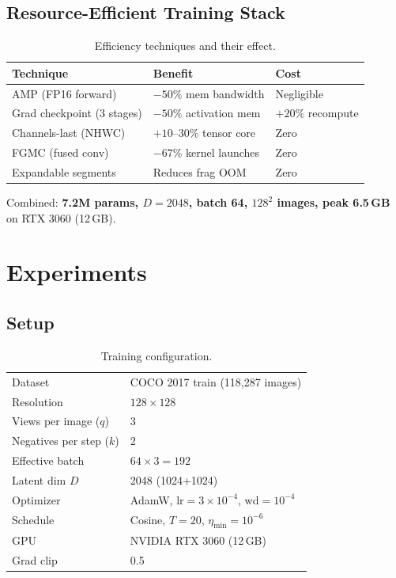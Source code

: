 \documentclass[10pt,twocolumn]{article}
\begin{document}
\subsection{Resource-Efficient Training Stack}

\begin{table}[h]
\centering\small
\caption{Efficiency techniques and their effect.}
\label{tab:efficiency}
\begin{tabular}{lll}
\toprule
Technique & Benefit & Cost \\
\midrule
AMP (FP16 forward) & $-50\%$ mem bandwidth & Negligible \\
Grad checkpoint (3 stages) & $-50\%$ activation mem & $+20\%$ recompute \\
Channels-last (NHWC) & $+10$--$30\%$ tensor core & Zero \\
FGMC (fused conv) & $-67\%$ kernel launches & Zero \\
Expandable segments & Reduces frag OOM & Zero \\
\bottomrule
\end{tabular}
\end{table}

Combined: \textbf{7.2M params, $D{=}2048$, batch 64, $128^2$ images,
peak 6.5\,GB} on RTX 3060 (12\,GB).

\section{Experiments}
\label{sec:exp}

\subsection{Setup}

\begin{table}[h]
\centering\small
\caption{Training configuration.}
\label{tab:setup}
\begin{tabular}{ll}
\toprule
Dataset & COCO 2017 train (118,287 images) \\
Resolution & $128\times128$ \\
Views per image ($q$) & 3 \\
Negatives per step ($k$) & 2 \\
Effective batch & $64\times3 = 192$ \\
Latent dim $D$ & 2048 (1024+1024) \\
Optimizer & AdamW, lr$=3\times10^{-4}$, wd$=10^{-4}$ \\
Schedule & Cosine, $T{=}20$, $\eta_{\min}{=}10^{-6}$ \\
GPU & NVIDIA RTX 3060 (12\,GB) \\
Grad clip & 0.5 \\
\bottomrule
\end{tabular}
\end{table}
\end{document}
